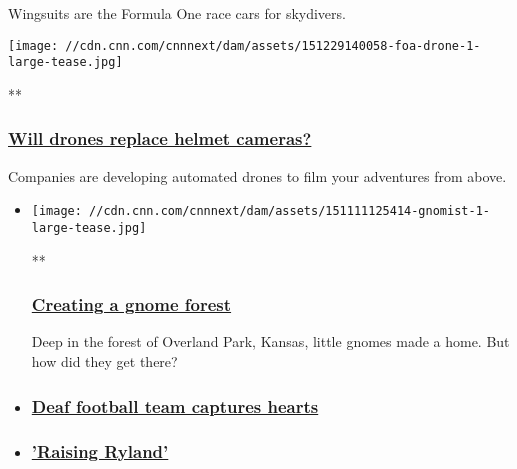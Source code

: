 Wingsuits are the Formula One race cars for skydivers.

\href{/videos/tech/2015/12/21/orig-automated-video-ski-drones-future-of-adventure.cnn}{}

\texttt{[image: //cdn.cnn.com/cnnnext/dam/assets/151229140058-foa-drone-1-large-tease.jpg]}

**

\hypertarget{will-drones-replace-helmet-cameras}{%
\subsubsection{\texorpdfstring{\href{/videos/tech/2015/12/21/orig-automated-video-ski-drones-future-of-adventure.cnn}{Will
drones replace helmet
cameras?}}{Will drones replace helmet cameras?}}\label{will-drones-replace-helmet-cameras}}

Companies are developing automated drones to film your adventures from
above.

\begin{itemize}
\item
  \href{/videos/us/2015/12/10/gnomist-great-big-story-cnn-films-sharon-liese-orig.cnn}{}

  \texttt{[image: //cdn.cnn.com/cnnnext/dam/assets/151111125414-gnomist-1-large-tease.jpg]}

  **

  \hypertarget{creating-a-gnome-forest}{%
  \subsubsection{\texorpdfstring{\href{/videos/us/2015/12/10/gnomist-great-big-story-cnn-films-sharon-liese-orig.cnn}{Creating
  a gnome
  forest}}{Creating a gnome forest}}\label{creating-a-gnome-forest}}

  Deep in the forest of Overland Park, Kansas, little gnomes made a
  home. But how did they get there?
\item
  \hypertarget{deaf-football-team-captures-hearts-}{%
  \subsubsection{\texorpdfstring{\href{/videos/tv/2015/11/13/digital-shorts-all-american-family-deaf-football-team-andrew-jenks.cnn}{Deaf
  football team captures hearts
  }}{Deaf football team captures hearts }}\label{deaf-football-team-captures-hearts-}}
\item
  \hypertarget{raising-ryland}{%
  \subsubsection{\texorpdfstring{\href{/videos/living/2015/03/06/digital-shorts-raising-ryland-orig.cnn}{'Raising
  Ryland'}}{'Raising Ryland'}}\label{raising-ryland}}
\end{itemize}

